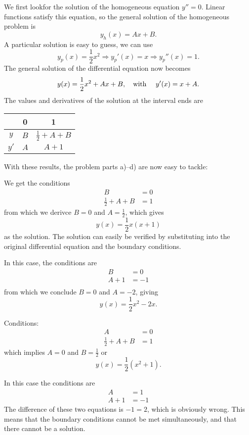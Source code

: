 \begin{loesung}
We first lookfor the solution of the homogeneous equation
$y''=0$.
Linear functions satisfy this equation, so the general solution of
the homogeneous problem is
\[
y_h(x)=Ax+B.
\]
A particular solution is easy to guess, we can use
\[
y_p(x)=\frac12x^2\Rightarrow y_p'(x)=x\Rightarrow y_p''(x)=1.
\]
The general solution of the differential equation now becomes
\[
y(x)=\frac12x^2+Ax+B, \text{\quad with \quad} y'(x)=x+A.
\]
The values and derivatives of the solution at the interval ends are
\begin{center}
\begin{tabular}{|c|cc|}
\hline
&0&1\\
\hline
$y$&$B$&$\frac12 +A+B$\\
$y'$&$A$&$A+1$\\
\hline
\end{tabular}
\end{center}
With these results, the problem parts a)--d) are now easy to tackle:
\begin{teilaufgaben}
\item
We get the conditions
\begin{align*}
B&=0\\
\frac12+A+B&=1
\end{align*}
from which we derivce $B=0$ and $A=\frac12$, which gives
\[
y(x)=\frac12x(x+1)
\]
as the solution.
The solution can easily be verified by substituting into the
original differential equation and the boundary conditions.
\item
In this case, the conditions are
\begin{align*}
B&=0\\
A+1&=-1\\
\end{align*}
from which we conclude $B=0$ and $A=-2$, giving
\[
y(x)=\frac12x^2-2x.
\]
\item
Conditions:
\begin{align*}
A&=0\\
\frac12+A+B&=1
\end{align*}
which implies $A=0$ and $B=\frac12$ or
\[
y(x)=\frac12(x^2+1).
\]
\item In this case the conditions are
\begin{align*}
A&=1\\
A+1&=-1
\end{align*}
The difference of these two equations is $-1=2$, which is obviously wrong.
This means that the boundary conditions cannot be met simultaneously,
and that there cannot be a solution.
\qedhere
\end{teilaufgaben}
\end{loesung}
